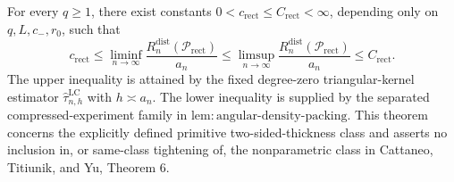 For every \(q\geq1\), there exist constants \(0<c_{\mathrm{rect}}\leq C_{\mathrm{rect}}<\infty\), depending only on \(q,L,c_{-},r_0\), such that
\[
c_{\mathrm{rect}}\leq\liminf_{n\to\infty}\frac{R_n^{\mathrm{dist}}(\mathcal{P}_{\mathrm{rect}})}{a_n}\leq\limsup_{n\to\infty}\frac{R_n^{\mathrm{dist}}(\mathcal{P}_{\mathrm{rect}})}{a_n}\leq C_{\mathrm{rect}}.
\]
The upper inequality is attained by the fixed degree-zero triangular-kernel estimator \(\widehat{\tau}^{\mathrm{LC}}_{n,h}\) with \(h\asymp a_n\). The lower inequality is supplied by the separated compressed-experiment family in \(\mathrm{lem:angular\text{-}density\text{-}packing}\). This theorem concerns the explicitly defined primitive two-sided-thickness class and asserts no inclusion in, or same-class tightening of, the nonparametric class in Cattaneo, Titiunik, and Yu, Theorem 6.